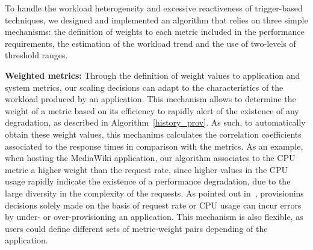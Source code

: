 To handle the workload heterogeneity and excessive reactiveness of trigger-based techniques, we designed and implemented an algorithm that relies on three simple mechanisms: the definition of weights to each metric included in the performance requirements, the estimation of the workload trend and the use of two-levels of threshold ranges. 

\vspace{2mm}


\textbf{Weighted metrics:}  Through the definition of weight values to application and system metrics, our scaling decisions can adapt to the characteristics of the workload produced by an application. This mechanism allows to determine the weight of a metric based on its efficiency to rapidly alert of the existence of any degradation, as described in Algorithm~\ref{history_prov}. As such, to automatically obtain these weight values, this mechanims calculates the correlation coefficients associated to the response times in comparison with the metrics. As an example, when hosting the MediaWiki application, our algorithm associates to the CPU metric a higher weight than the request rate, since higher values in the CPU usage rapidly indicate the existence of a performance degradation, due to the large diversity in the complexity of the requests. As pointed out in~\cite{singh_autonomic_2010}, provisionins decisions solely made on the basis of request rate or CPU usage can incur errors  by under- or over-provisioning an application. This mechanism is also flexible, as users could define different sets of metric-weight pairs depending of the application.




